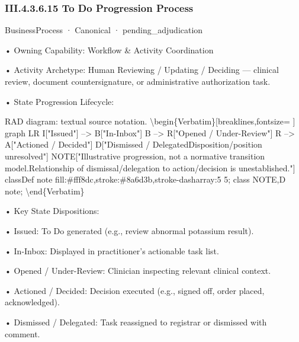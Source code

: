 \subsubsection*{III.4.3.6.15 To Do Progression Process}
\label{navigation:III.4.3.6.15}

\label{element:c5e4c3076b094c98a628179b91ae03d0}
{\small BusinessProcess · Canonical · pending\_adjudication}\par

•
Owning Capability: Workflow \& Activity Coordination



•
Activity Archetype: Human Reviewing / Updating / Deciding — clinical review, document countersignature, or administrative authorization task.



•
State Progression Lifecycle:



RAD diagram: textual source notation.
\textbackslash{}begin\{Verbatim\}[breaklines,fontsize=
]
graph LR
    I["Issued"] --> B["In-Inbox"]
    B --> R["Opened / Under-Review"]
    R --> A["Actioned / Decided"]
    D["Dismissed / Delegated\newline{}Disposition/position unresolved"]
    NOTE["Illustrative progression, not a normative transition model.\newline{}Relationship of dismissal/delegation to action/decision is unestablished."]
    classDef note fill:\#fff8dc,stroke:\#8a6d3b,stroke-dasharray:5 5;
    class NOTE,D note;
\textbackslash{}end\{Verbatim\}



•
Key State Dispositions:



•
Issued: To Do generated (e.g., review abnormal potassium result).



•
In-Inbox: Displayed in practitioner's actionable task list.



•
Opened / Under-Review: Clinician inspecting relevant clinical context.



•
Actioned / Decided: Decision executed (e.g., signed off, order placed, acknowledged).



•
Dismissed / Delegated: Task reassigned to registrar or dismissed with comment.



